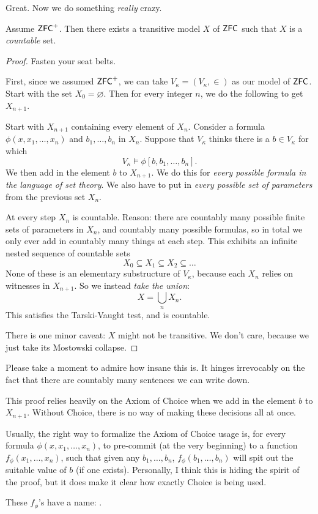 Great. Now we do something \emph{really} crazy.
\begin{theorem}
	Assume $\mathsf{ZFC}^+$. Then there exists a transitive model $X$ of $\mathsf{ZFC}$
	such that $X$ is a \emph{countable} set.
\end{theorem}
\begin{proof}
	Fasten your seat belts.

	First, since we assumed $\mathsf{ZFC}^+$,
	we can take $V_\kappa = (V_\kappa, \in)$ as our model of $\mathsf{ZFC}$.
	Start with the set $X_0 = \varnothing$.
	Then for every integer $n$, we do the following to get $X_{n+1}$.
	\begin{itemize}
		\ii Start with $X_{n+1}$ containing every element of $X_n$.
		\ii Consider a formula $\phi(x, x_1, \dots, x_n)$
		and $b_1, \dots, b_n$ in $X_n$.
		Suppose that $V_\kappa$ thinks there is a $b \in V_\kappa$ for which
		\[ V_\kappa \vDash \phi[b, b_1, \dots, b_n]. \]
		We then add in the element $b$ to $X_{n+1}$.
		\ii We do this for \emph{every possible formula in the language of set theory}.
		We also have to put in \emph{every possible set of parameters} from the previous set $X_n$.
	\end{itemize}
	At every step $X_n$ is countable.
	Reason: there are countably many possible finite sets of parameters in $X_n$,
	and countably many possible formulas, so in total we only ever add in countably many things
	at each step.
	This exhibits an infinite nested sequence of countable sets
	\[ X_0 \subseteq X_1 \subseteq X_2 \subseteq \dots \]
	None of these is an elementary substructure of $V_\kappa$,
	because each $X_n$ relies on witnesses in $X_{n+1}$.
	So we instead \emph{take the union}:
	\[ X = \bigcup_n X_n. \]
	This satisfies the Tarski-Vaught test, and is countable.

	There is one minor caveat: $X$ might not be transitive.
	We don't care, because we just take its Mostowski collapse.
\end{proof}

Please take a moment to admire how insane this is.
It hinges irrevocably on the fact that there are countably many sentences we can write down.

\begin{remark}
	This proof relies heavily on the Axiom of Choice
	when we add in the element $b$ to $X_{n+1}$.
	Without Choice, there is no way of making these decisions all at once.

	Usually, the right way to formalize the Axiom of Choice usage is,
	for every formula $\phi(x, x_1, \dots, x_n)$, to pre-commit (at the very beginning)
	to a function $f_\phi(x_1, \dots, x_n)$, such that given any $b_1, \dots, b_n$,
	$f_\phi(b_1, \dots, b_n)$ will spit out the suitable value of $b$ (if one exists).
	Personally, I think this is hiding the spirit of the proof, but it does
	make it clear how exactly Choice is being used.

	These $f_\phi$'s have a name: .
\end{remark}


